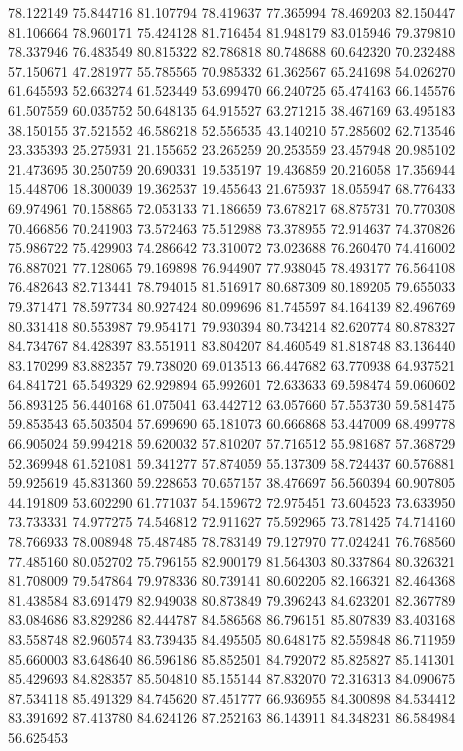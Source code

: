 78.122149
75.844716
81.107794
78.419637
77.365994
78.469203
82.150447
81.106664
78.960171
75.424128
81.716454
81.948179
83.015946
79.379810
78.337946
76.483549
80.815322
82.786818
80.748688
60.642320
70.232488
57.150671
47.281977
55.785565
70.985332
61.362567
65.241698
54.026270
61.645593
52.663274
61.523449
53.699470
66.240725
65.474163
66.145576
61.507559
60.035752
50.648135
64.915527
63.271215
38.467169
63.495183
38.150155
37.521552
46.586218
52.556535
43.140210
57.285602
62.713546
23.335393
25.275931
21.155652
23.265259
20.253559
23.457948
20.985102
21.473695
30.250759
20.690331
19.535197
19.436859
20.216058
17.356944
15.448706
18.300039
19.362537
19.455643
21.675937
18.055947
68.776433
69.974961
70.158865
72.053133
71.186659
73.678217
68.875731
70.770308
70.466856
70.241903
73.572463
75.512988
73.378955
72.914637
74.370826
75.986722
75.429903
74.286642
73.310072
73.023688
76.260470
74.416002
76.887021
77.128065
79.169898
76.944907
77.938045
78.493177
76.564108
76.482643
82.713441
78.794015
81.516917
80.687309
80.189205
79.655033
79.371471
78.597734
80.927424
80.099696
81.745597
84.164139
82.496769
80.331418
80.553987
79.954171
79.930394
80.734214
82.620774
80.878327
84.734767
84.428397
83.551911
83.804207
84.460549
81.818748
83.136440
83.170299
83.882357
79.738020
69.013513
66.447682
63.770938
64.937521
64.841721
65.549329
62.929894
65.992601
72.633633
69.598474
59.060602
56.893125
56.440168
61.075041
63.442712
63.057660
57.553730
59.581475
59.853543
65.503504
57.699690
65.181073
60.666868
53.447009
68.499778
66.905024
59.994218
59.620032
57.810207
57.716512
55.981687
57.368729
52.369948
61.521081
59.341277
57.874059
55.137309
58.724437
60.576881
59.925619
45.831360
59.228653
70.657157
38.476697
56.560394
60.907805
44.191809
53.602290
61.771037
54.159672
72.975451
73.604523
73.633950
73.733331
74.977275
74.546812
72.911627
75.592965
73.781425
74.714160
78.766933
78.008948
75.487485
78.783149
79.127970
77.024241
76.768560
77.485160
80.052702
75.796155
82.900179
81.564303
80.337864
80.326321
81.708009
79.547864
79.978336
80.739141
80.602205
82.166321
82.464368
81.438584
83.691479
82.949038
80.873849
79.396243
84.623201
82.367789
83.084686
83.829286
82.444787
84.586568
86.796151
85.807839
83.403168
83.558748
82.960574
83.739435
84.495505
80.648175
82.559848
86.711959
85.660003
83.648640
86.596186
85.852501
84.792072
85.825827
85.141301
85.429693
84.828357
85.504810
85.155144
87.832070
72.316313
84.090675
87.534118
85.491329
84.745620
87.451777
66.936955
84.300898
84.534412
83.391692
87.413780
84.624126
87.252163
86.143911
84.348231
86.584984
56.625453
